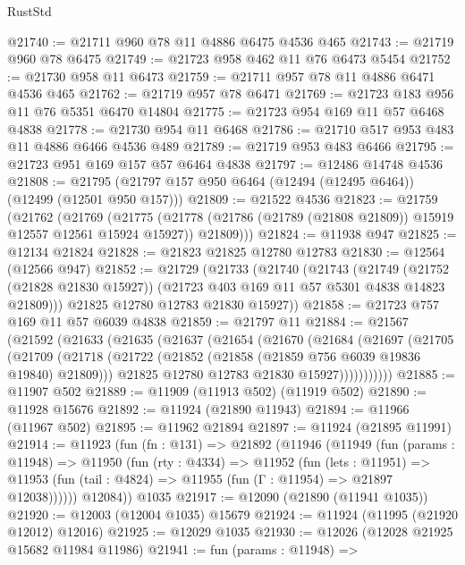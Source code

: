 \begin{lexlean}{RustStd}
\begin{coremodule}
{\begin{coremodule}
{{{{{{{{{{{{{{{{{{{{{{{{{{{{{{{{{{{{{{{{{{{{{{{{{{{{{{{{{{{{{{{{{{{{{{{{{{{{{{{{@21740 := @21711 @960 @78 @11 @4886 @6475 @4536 @465
@21743 := @21719 @960 @78 @6475
@21749 := @21723 @958 @462 @11 @76 @6473 @5454
@21752 := @21730 @958 @11 @6473
@21759 := @21711 @957 @78 @11 @4886 @6471 @4536 @465
@21762 := @21719 @957 @78 @6471
@21769 := @21723 @183 @956 @11 @76 @5351 @6470 @14804
@21775 := @21723 @954 @169 @11 @57 @6468 @4838
@21778 := @21730 @954 @11 @6468
@21786 := @21710 @517 @953 @483 @11 @4886 @6466 @4536 @489
@21789 := @21719 @953 @483 @6466
@21795 := @21723 @951 @169 @157 @57 @6464 @4838
@21797 := @12486 @14748 @4536
@21808 := @21795 (@21797 @157 @950 @6464 (@12494 (@12495 @6464)) (@12499 (@12501 @950 @157)))
@21809 := @21522 @4536
@21823 := @21759
    (@21762
      (@21769
        (@21775
          (@21778 (@21786 (@21789 (@21808 @21809)) @15919 @12557 @12561 @15924 @15927))
          @21809)))
@21824 := @11938 @947
@21825 := @12134 @21824
@21828 := @21823 @21825 @12780 @12783
@21830 := @12564 (@12566 @947)
@21852 := @21729
    (@21733
      (@21740
        (@21743
          (@21749
            (@21752 (@21828 @21830 @15927))
            (@21723 @403 @169 @11 @57 @5301 @4838 @14823 @21809)))
        @21825
        @12780
        @12783
        @21830
        @15927))
@21858 := @21723 @757 @169 @11 @57 @6039 @4838
@21859 := @21797 @11
@21884 := @21567
    (@21592
      (@21633
        (@21635
          (@21637
            (@21654
              (@21670
                (@21684
                  (@21697
                    (@21705
                      (@21709
                        (@21718
                          (@21722 (@21852 (@21858 (@21859 @756 @6039 @19836 @19840) @21809)))
                          @21825
                          @12780
                          @12783
                          @21830
                          @15927)))))))))))
@21885 := @11907 @502
@21889 := @11909 (@11913 @502) (@11919 @502)
@21890 := @11928 @15676
@21892 := @11924 (@21890 @11943)
@21894 := @11966 (@11967 @502)
@21895 := @11962 @21894
@21897 := @11924 (@21895 @11991)
@21914 := @11923
    (fun (fn : @131) =>
    @21892
      (@11946
        (@11949
          (fun (params : @11948) =>
          @11950
            (fun (rty : @4334) =>
            @11952
              (fun (lets : @11951) =>
              @11953 (fun (tail : @4824) => @11955 (fun (Γ : @11954) => @21897 @12038))))))
        @12084))
    @1035
@21917 := @12090 (@21890 (@11941 @1035))
@21920 := @12003 (@12004 @1035) @15679
@21924 := @11924 (@11995 (@21920 @12012) @12016)
@21925 := @12029 @1035
@21930 := @12026 (@12028 @21925 @15682 @11984 @11986)
@21941 := fun (params : @11948) =>
}}}}}}}}}}}}}}}}}}}}}}}}}}}}}}}}}}}}}}}}}}}}}}}}}}}}}}}}}}}}}}}}}}}}}}}}}}}}}}}}
\end{coremodule}}
\end{coremodule}
\end{lexlean}
